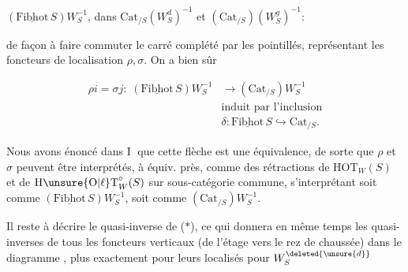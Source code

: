 
  $(\underline{\mathrm{Fibhot}}\,S)W_S^{-1}$, dans $\mathrm{Cat}_{/S}(W_S^d)^{-1}$ et $(\mathrm{Cat}_{/S})(W_S^g)^{-1}$:


de façon à faire commuter le carré complété par les pointillés, représentant les foncteurs de localisation $\rho,\sigma$. On a bien sûr 

\[
\begin{aligned}
\rho i=\sigma j:\;(\underline{\mathrm{Fibhot}}\,S)W_S^{-1}&\longrightarrow(\mathrm{Cat}_{/S})W_S^{-1}\\
&\text{induit par l'inclusion}\\
&\delta:\underline{\mathrm{Fibhot}}\,S\hookrightarrow\mathrm{Cat}_{/S}.
\end{aligned}\tag*{(*)}
\]

Nous avons énoncé  dans \textcircled{I} que cette flèche est une équivalence, de sorte que $\rho$ et $\sigma$ peuvent être interprétés, à équiv.  près, comme des rétractions de $\mathrm{HOT}_{W}(S)$ et de $\mathrm{H\unsure{O|\ell}T}_{W}^{\circ}(S)$ sur  sous-catégorie commune, s'interprétant soit comme $(\underline{\mathrm{Fibhot}}\,S)W_S^{-1}$, soit comme $(\mathrm{Cat}_{/S})W_S^{-1}$.

Il reste à décrire le  quasi-inverse de ($*$), ce qui donnera en même temps les quasi-inverses  de tous les foncteurs verticaux (de l'étage vers le rez de chaussée) dans le diagramme , plus exactement pour leurs localisés pour $W_S^{\deleted{\unsure{d}}}$ 
